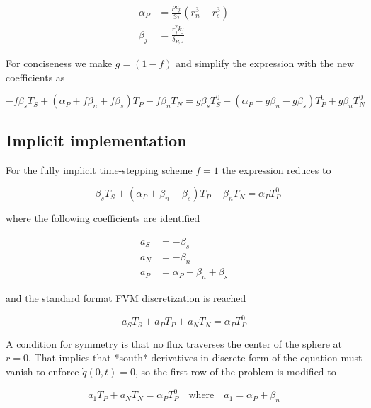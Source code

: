 \documentclass[oneside]{textbook}
\begin{document}
\begin{equation}
\begin{aligned}
	\alpha_{P}  & = \frac{\rho{}c_{p}}{3\tau}\left(r_n^3-r_s^3\right)\\[8pt]
	\beta_{j}   & = \frac{r_j^2k_j}{\delta_{P,J}}
\end{aligned}
\end{equation}

For conciseness we make $g=(1-f)$ and simplify the expression with the new coefficients as

\begin{equation}
-f\beta_{s}T_S+
(\alpha_{P}+f\beta_{n}+f\beta_{s})T_P
-f\beta_{n}T_N
=
g\beta_{s}T_S^{0}+
(\alpha_{P}-g\beta_{n}-g\beta_{s})T_P^{0}+
g\beta_{n}T_N^{0}
\end{equation}

\subsection{Implicit implementation}

For the fully implicit time-stepping scheme $f=1$ the expression reduces to

\begin{equation}
-\beta_{s}T_S+
(\alpha_{P}+\beta_{n}+\beta_{s})T_P
-\beta_{n}T_N
=
\alpha_{P}T_P^{0}
\end{equation}

where the following coefficients are identified

\begin{equation}
\begin{aligned}
	a_{S} & = -\beta_{s}\\[8pt]
	a_{N} & = -\beta_{n}\\[8pt]
	a_{P} & = \alpha_{P}+\beta_{n}+\beta_{s}
\end{aligned}
\end{equation}

and the standard format FVM discretization is reached

\begin{equation}
a_ST_S + a_PT_P + a_NT_N = \alpha_{P}T_P^{0}
\end{equation}

A condition for symmetry is that no flux traverses the center of the sphere at $r=0$. That implies that *south* derivatives in discrete form of the equation must vanish to enforce $\dot{q}(0,t)=0$, so the first row of the problem is modified to

\begin{equation}
a_1T_P + a_NT_N = \alpha_{P}T_P^{0}\quad\text{where}\quad{}a_1=\alpha_{P}+\beta_{n}
\end{equation}
\end{document}
